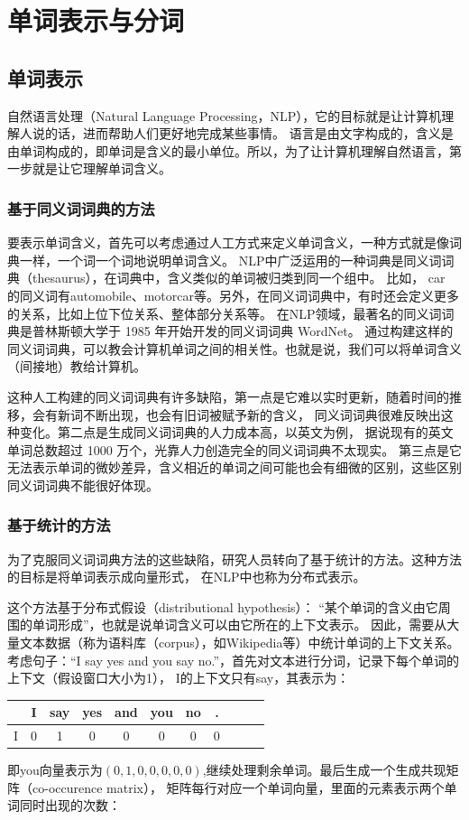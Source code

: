 \chapter{单词表示与分词}
\section{单词表示}
自然语言处理（Natural Language Processing，NLP），它的目标就是让计算机理解人说的话，进而帮助人们更好地完成某些事情。
语言是由文字构成的，含义是由单词构成的，即单词是含义的最小单位。所以，为了让计算机理解自然语言，第一步就是让它理解单词含义。

\subsection{基于同义词词典的方法}
要表示单词含义，首先可以考虑通过人工方式来定义单词含义，一种方式就是像词典一样，一个词一个词地说明单词含义。
NLP中广泛运用的一种词典是同义词词典（thesaurus），在词典中，含义类似的单词被归类到同一个组中。
比如， car 的同义词有automobile、motorcar等。另外，在同义词词典中，有时还会定义更多的关系，比如上位下位关系、整体部分关系等。
在NLP领域，最著名的同义词词典是普林斯顿大学于 1985 年开始开发的同义词词典 WordNet。
通过构建这样的同义词词典，可以教会计算机单词之间的相关性。也就是说，我们可以将单词含义（间接地）教给计算机。

这种人工构建的同义词词典有许多缺陷，第一点是它难以实时更新，随着时间的推移，会有新词不断出现，也会有旧词被赋予新的含义，
同义词词典很难反映出这种变化。第二点是生成同义词词典的人力成本高，以英文为例，
据说现有的英文单词总数超过 1000 万个，光靠人力创造完全的同义词词典不太现实。
第三点是它无法表示单词的微妙差异，含义相近的单词之间可能也会有细微的区别，这些区别同义词词典不能很好体现。

\subsection{基于统计的方法}
为了克服同义词词典方法的这些缺陷，研究人员转向了基于统计的方法。这种方法的目标是将单词表示成向量形式，
在NLP中也称为分布式表示。

这个方法基于分布式假设（distributional hypothesis）：
“某个单词的含义由它周围的单词形成”，也就是说单词含义可以由它所在的上下文表示。
因此，需要从大量文本数据（称为语料库（corpus），如Wikipedia等）中统计单词的上下文关系。
考虑句子：“I say yes and you say no.”，首先对文本进行分词，记录下每个单词的上下文（假设窗口大小为1），
I的上下文只有say，其表示为：
\begin{table}[H]
	\centering
	\begin{tabular}{c|cccccccccc}
		  & I & say & yes & and & you & no & . \\
		\hline
		I & 0 & 1   & 0   & 0   & 0   & 0  & 0 \\
	\end{tabular}
\end{table}
即you向量表示为$(0, 1, 0, 0, 0, 0, 0)$,继续处理剩余单词。最后生成一个生成共现矩阵（co-occurence matrix），
矩阵每行对应一个单词向量，里面的元素表示两个单词同时出现的次数：

